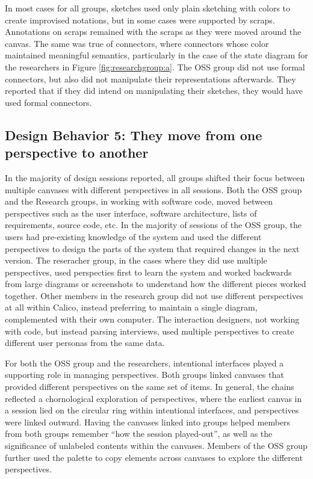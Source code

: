 In most cases for all groups, sketches used only plain sketching with colors to create improvised notations, but in some cases were supported by scraps. Annotations on scraps remained with the scraps as they were moved around the canvas. The same was true of connectors, where connectors whose color maintained meaningful semantics, particularly in the case of the state diagram for the researchers in Figure \ref{fig:researchgroup:a}. The OSS group did not use formal connectors, but also did not manipulate their representations afterwards. They reported that if they did intend on manipulating their sketches, they would have used formal connectors.


%

\subsection{Design Behavior 5: They move from one perspective to another}

In the majority of design sessions reported, all groups shifted their focus between multiple canvases with different perspectives in all sessions. Both the OSS group and the Research groups, in working with software code, moved between perspectives such as the user interface, software architecture, lists of requirements, source code, etc. In the majority of sessions of the OSS group, the users had pre-existing knowledge of the system and used the different perspectives to design the parts of the system that required changes in the next version. The reseracher group, in the cases where they did use multiple perspectives, used perspecties first to learn the system and worked backwards from large diagrams or screenshots to understand how the different pieces worked together. Other members in the research group did not use different perspectives at all within Calico, instead preferring to maintain a single diagram, complemented with their own computer. The interaction designers, not working with code, but instead parsing interviews, used multiple perspectives to create different user personas from the same data. 

For both the OSS group and the researchers, intentional interfaces played a supporting role in managing perspectives. Both groups linked canvases that provided different perspectives on the same set of items. In general, the chains reflected a chornological exploration of perspectives, where the earliest canvas in a session lied on the circular ring within intentional interfaces, and perspectives were linked outward. Having the canvases linked into groups helped members from both groups remember ``how the session played-out'', as well as the significance of unlabeled contents within the canvases. Members of the OSS group further used the palette to copy elements across canvases to explore the different perspectives.

